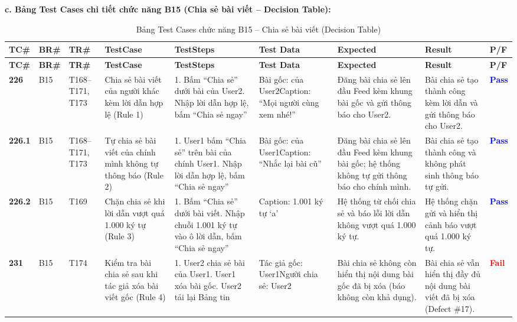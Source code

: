 \documentclass[11pt,a4paper]{article}
\begin{document}
\noindent\textbf{c. Bảng Test Cases chi tiết chức năng B15 (Chia sẻ bài viết -- Decision Table):}
\begingroup
\scriptsize
\setlength{\tabcolsep}{3pt}
\begin{longtable}{|C{0.85cm}|C{0.7cm}|C{0.95cm}|L{2.0cm}|L{3.0cm}|L{2.25cm}|L{2.6cm}|L{2.5cm}|C{0.85cm}|}
\hline
{}
\textbf{TC\#} & \textbf{BR\#} & \textbf{TR\#} & \textbf{TestCase} & \textbf{TestSteps} & \textbf{Test Data} & \textbf{Expected} & \textbf{Result} & \textbf{P/F} \tabularnewline
\hline
\endfirsthead
\hline
{}
\textbf{TC\#} & \textbf{BR\#} & \textbf{TR\#} & \textbf{TestCase} & \textbf{TestSteps} & \textbf{Test Data} & \textbf{Expected} & \textbf{Result} & \textbf{P/F} \tabularnewline
\hline
\endhead
\hline
\endfoot
\hline
\caption{Bảng Test Cases chức năng B15 -- Chia sẻ bài viết (Decision Table)}
\endlastfoot
\textbf{226} & B15 & T168--T171, T173 & Chia sẻ bài viết của người khác kèm lời dẫn hợp lệ (Rule 1) & 1. Bấm ``Chia sẻ'' dưới bài của User2. Nhập lời dẫn hợp lệ, bấm ``Chia sẻ ngay'' & Bài gốc: của User2\newline Caption: ``Mọi người cùng xem nhé!'' & Đăng bài chia sẻ lên đầu Feed kèm khung bài gốc và gửi thông báo cho User2. & Bài chia sẻ tạo thành công kèm lời dẫn và gửi thông báo cho User2. & \textcolor{blue}{\textbf{Pass}} \\ \hline
\textbf{226.1} & B15 & T168--T171, T173 & Tự chia sẻ bài viết của chính mình không tự thông báo (Rule 2) & 1. User1 bấm ``Chia sẻ'' trên bài của chính User1. Nhập lời dẫn hợp lệ, bấm ``Chia sẻ ngay'' & Bài gốc: của User1\newline Caption: ``Nhắc lại bài cũ'' & Đăng bài chia sẻ lên đầu Feed kèm khung bài gốc; hệ thống không tự gửi thông báo cho chính mình. & Bài chia sẻ tạo thành công và không phát sinh thông báo tự gửi. & \textcolor{blue}{\textbf{Pass}} \\ \hline
\textbf{226.2} & B15 & T169 & Chặn chia sẻ khi lời dẫn vượt quá 1.000 ký tự (Rule 3) & 1. Bấm ``Chia sẻ'' dưới bài viết. Nhập chuỗi 1.001 ký tự vào ô lời dẫn, bấm ``Chia sẻ ngay'' & Caption: 1.001 ký tự `a' & Hệ thống từ chối chia sẻ và báo lỗi lời dẫn không vượt quá 1.000 ký tự. & Hệ thống chặn gửi và hiển thị cảnh báo vượt quá 1.000 ký tự. & \textcolor{blue}{\textbf{Pass}} \\ \hline
\textbf{231} & B15 & T174 & Kiểm tra bài chia sẻ sau khi tác giả xóa bài viết gốc (Rule 4) & 1. User2 chia sẻ bài của User1. User1 xóa bài gốc. User2 tải lại Bảng tin & Tác giả gốc: User1\newline Người chia sẻ: User2 & Bài chia sẻ không còn hiển thị nội dung bài gốc đã bị xóa (báo không còn khả dụng). & Bài chia sẻ vẫn hiển thị đầy đủ nội dung bài viết đã bị xóa (Defect \#17). & \textcolor{red}{\textbf{Fail}} \\ \hline
\end{longtable}
\endgroup
\end{document}
